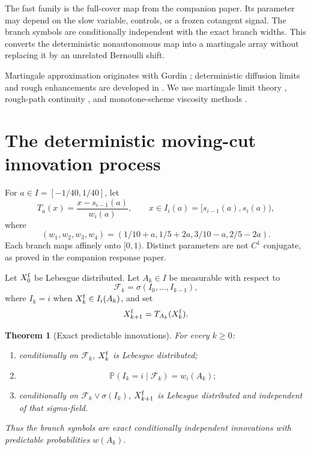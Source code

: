 \documentclass[11pt,reqno]{amsart}
\newtheorem{theorem}{Theorem}[section]
\theoremstyle{definition}
\theoremstyle{remark}
\newcommand{\F}{\mathcal F}
\newcommand{\Pp}{\mathbb P}
\begin{document}
The fast family is the full-cover map from the companion paper.  Its parameter
may depend on the slow variable, controls, or a frozen cotangent signal.  The
branch symbols are conditionally independent with the exact branch widths.
This converts the deterministic nonautonomous map into a martingale array
without replacing it by an unrelated Bernoulli shift.

Martingale approximation originates with Gordin \cite{Gordin1969};
deterministic diffusion limits and rough enhancements are developed in
\cite{MelbourneStuart2011,KellyMelbourne2016,KellyMelbourne2017,
ChevyrevFrizKorepanovMelbourne2020}.  We use martingale limit theory
\cite{HallHeyde1980,JacodShiryaev2003}, rough-path continuity
\cite{Lyons1998,FrizVictoir2010,FrizHairer2014}, and monotone-scheme viscosity
methods \cite{BarlesSouganidis1991,CrandallIshiiLions1992}.

\section{The deterministic moving-cut innovation process}\label{sec:innovation}

For $a\in I=[-1/40,1/40]$, let
\[
 T_a(x)=\frac{x-s_{i-1}(a)}{w_i(a)},
 \qquad x\in I_i(a)=[s_{i-1}(a),s_i(a)),
\]
where
\[
 (w_1,w_2,w_3,w_4)
 =(1/10+a,1/5+2a,3/10-a,2/5-2a).
\]
Each branch maps affinely onto $[0,1)$.  Distinct parameters are not $C^1$
conjugate, as proved in the companion response paper.

Let $X_0^{\rm f}$ be Lebesgue distributed.  Let $A_k\in I$ be measurable with
respect to
\[
 \F_k=\sigma(I_0,\ldots,I_{k-1}),
\]
where $I_k=i$ when $X_k^{\rm f}\in I_i(A_k)$, and set
\[
 X_{k+1}^{\rm f}=T_{A_k}(X_k^{\rm f}).
\]

\begin{theorem}[Exact predictable innovations]\label{thm:innovation}
For every $k\ge0$:
\begin{enumerate}[label=(\roman*)]
\item conditionally on $\F_k$, $X_k^{\rm f}$ is Lebesgue distributed;
\item
\[
 \Pp(I_k=i\mid\F_k)=w_i(A_k);
\]
\item conditionally on $\F_k\vee\sigma(I_k)$,
$X_{k+1}^{\rm f}$ is Lebesgue distributed and independent of that
sigma-field.
\end{enumerate}
Thus the branch symbols are exact conditionally independent innovations with
predictable probabilities $w(A_k)$.
\end{theorem}
\end{document}
